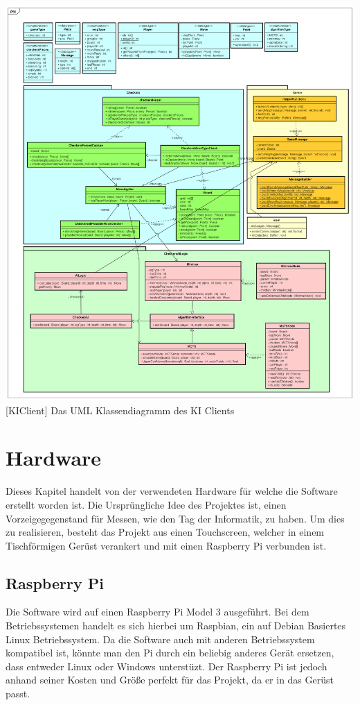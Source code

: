 \documentclass[12pt,a4paper,bibliography=totocnumbered,listof=totocnumbered]{article}
\begin{document}
\vspace{1em}
\begin{minipage}{\linewidth}
	\centering
	\includegraphics[width=0.9\linewidth]{pics/GameClientClassDiagram.png}
	[KIClient]{ Das UML Klassendiagramm des KI Clients }
	\label{fig:KIClientClassDiagram}
\end{minipage}


\pagebreak
\section{Hardware}
Dieses Kapitel handelt von der verwendeten Hardware für welche die Software erstellt worden ist. 
Die Ursprüngliche Idee des Projektes ist, einen Vorzeigegegenstand für Messen, wie den Tag der Informatik, zu haben.
Um dies zu realisieren, besteht das Projekt aus einen Touchscreen, welcher in einem Tischförmigen Gerüst verankert 
und mit einen Raspberry Pi verbunden ist.

\subsection{Raspberry Pi}
Die Software wird auf einen Raspberry Pi Model 3 ausgeführt. Bei dem Betriebssystemen handelt es sich hierbei um 
Raspbian, ein auf Debian Basiertes Linux Betriebssystem. \cite{RaspberryPi} Da die Software auch mit anderen Betriebssystem
kompatibel ist, könnte man den Pi durch ein beliebig anderes Gerät ersetzen, dass entweder Linux oder Windows unterstüzt.
Der Raspberry Pi ist jedoch anhand seiner Kosten und Größe perfekt für das Projekt, da er in das Gerüst passt.
\end{document}
